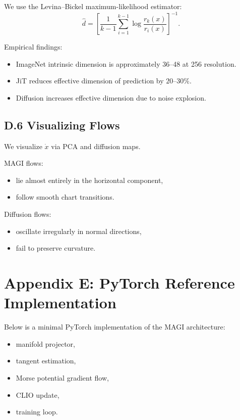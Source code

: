 \documentclass[11pt,a4paper,twocolumn]{article}
\begin{document}
We use the Levina--Bickel maximum-likelihood estimator:
\[
\widehat{d}
=
\left[
\frac{1}{k-1} \sum_{i=1}^{k-1}
\log\frac{r_k(x)}{r_i(x)}
\right]^{-1}.
\]

Empirical findings:
\begin{itemize}
\item ImageNet intrinsic dimension is approximately 36--48 at 256 resolution.
\item JiT reduces effective dimension of prediction by $20$--$30\%$.
\item Diffusion increases effective dimension due to noise explosion.
\end{itemize}


\subsection*{D.6 Visualizing Flows}

We visualize $\dot{x}$ via PCA and diffusion maps.

MAGI flows:
\begin{itemize}
\item lie almost entirely in the horizontal component,
\item follow smooth chart transitions.
\end{itemize}

Diffusion flows:
\begin{itemize}
\item oscillate irregularly in normal directions,
\item fail to preserve curvature.
\end{itemize}


\onecolumn
\section*{Appendix E: PyTorch Reference Implementation}

Below is a minimal PyTorch implementation of the MAGI architecture:
\begin{itemize}
\item manifold projector,
\item tangent estimation,
\item Morse potential gradient flow,
\item CLIO update,
\item training loop.
\end{itemize}
\end{document}
